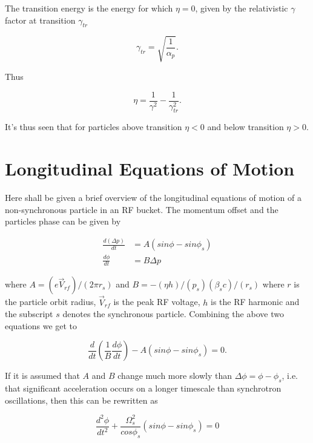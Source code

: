 The transition energy is the energy for which $\eta=0$, given by the relativistic $\gamma$ factor at transition $\gamma_{tr}$

\begin{equation}
\gamma_{tr} = \sqrt{\frac{1}{\alpha_{p}}}.
\end{equation}

Thus 

\begin{equation}
\eta = \frac{1}{\gamma^{2}} - \frac{1}{\gamma_{tr}^{2}}.
\end{equation}

It's thus seen that for particles above transition $\eta < 0$ and below transition $\eta > 0$.

\section{Longitudinal Equations of Motion}

Here shall be given a brief overview of the longitudinal equations of motion of a non-synchronous particle in an RF bucket. The momentum offset and the particles phase can be given by

\begin{align}
\frac{d\left( \Delta p \right)}{dt} & =  A\left( sin \phi - sin \phi_{s} \right) \\
\frac{d\phi}{dt} & =  B \Delta p
\end{align}

where $A=(e\vec{V}_{rf})/(2\pi r_{s})$ and $B=-(\eta h)/(p_{s})(\beta_{s}c)/(r_{s})$ where $r$ is the particle orbit radius, $\vec{V}_{rf}$ is the peak RF voltage, $h$ is the RF harmonic and the subscript $s$ denotes the synchronous particle. Combining the above two equations we get to

\begin{equation}
\frac{d}{dt}\left( \frac{1}{B} \frac{d\phi}{dt} \right) - A \left( sin \phi - sin \phi_{s} \right) = 0
\label{eqn:GenLongMot}.
\end{equation}

If it is assumed that $A$ and $B$ change much more slowly than $\Delta \phi = \phi - \phi_{s}$, i.e. that significant acceleration occurs on a longer timescale than synchrotron oscillations, then this can be rewritten as

\begin{equation}
\frac{d^{2}\phi}{dt^{2}} + \frac{\Omega_{s}^{2}}{cos \phi_{s}} \left( sin\phi - sin\phi_{s} \right) = 0
\label{eqn:phiEOM}
\end{equation}

